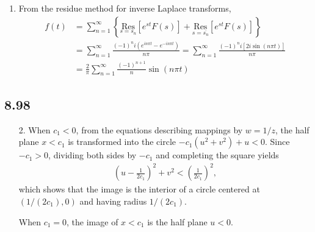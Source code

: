 \documentclass[a4paper,12pt]{article}
\begin{document}
\begin{enumerate}
\begin{enumerate}
            \item
                From the residue method for inverse Laplace transforms,
                \begin{align*}
                    f(t) &= \sum_{n = 1}^\infty \left\{ \underset{s = s_n}{\text{Res}} \left[ e^{st} F(s) \right] + \underset{s = \overline{s_n}}{\text{Res}} \left[ e^{st} F(s) \right] \right\} \\
                    &= \sum_{n = 1}^\infty \frac{(-1)^n i \left( e^{in\pi t} - e^{-in\pi t} \right)}{n\pi}
                    = \sum_{n = 1}^\infty \frac{(-1)^n i[2i \sin(n\pi t)]}{n\pi} \\
                    &= \frac{2}{\pi} \sum_{n = 1}^\infty \frac{(-1)^{n + 1}}{n} \sin(n\pi t)
                \end{align*}
        \end{enumerate}
\end{enumerate}

\subsection*{8.98}
\begin{enumerate}
    \item[2.]
        When $c_1 < 0$, from the equations describing mappings by $w = 1/z$, the half plane $x < c_1$ is transformed into the circle $-c_1(u^2 + v^2) + u < 0$. Since $-c_1 > 0$, dividing both sides by $-c_1$ and completing the square yields
        \begin{align*}
            \left( u - \frac{1}{2c_1} \right)^2 + v^2 < \left( \frac{1}{2c_1} \right)^2,
        \end{align*}
        which shows that the image is the interior of a circle centered at $(1/(2c_1), 0)$ and having radius $1/(2c_1)$. \par
        When $c_1 = 0$, the image of $x < c_1$ is the half plane $u < 0$.
\end{enumerate}
\end{document}
